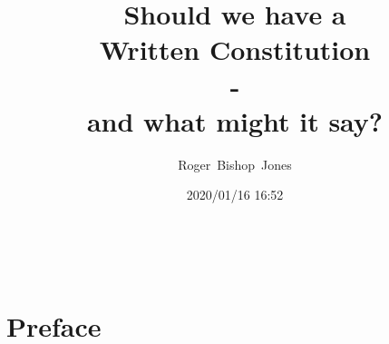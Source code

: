 \documentclass[14pt,titlepage]{extarticle}
\title{\LARGE \bf Should we have a \\Written Constitution \\- \\and what might it say?}
\author{Roger~Bishop~Jones}
\date{\small 2020/01/16 16:52}
\newcommand{\ignore}[1]{}
\begin{document}

                               
\begin{titlepage}
\maketitle





\end{titlepage}

\ \

\ignore{
\begin{centering}
{\LARGE \bf Should we have a \\Written Constitution?\\ - \\and what might it say?\\}
\end{centering}
}%

\setcounter{tocdepth}{2}
{\parskip-0pt\tableofcontents}




\section*{Preface}
\end{document}
